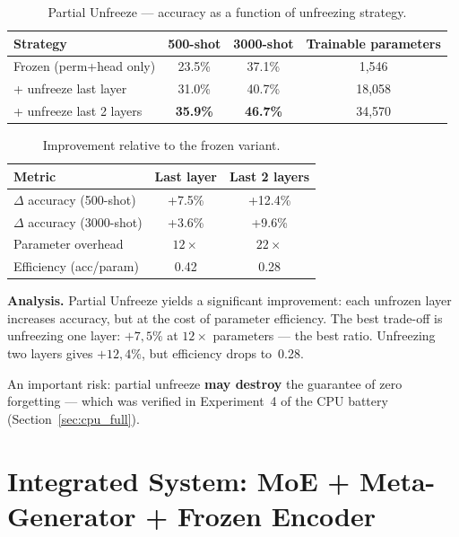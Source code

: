 \documentclass[11pt,a4paper]{report}
\begin{document}
\begin{table}[h!]
\centering
\caption{Partial Unfreeze --- accuracy as a function of unfreezing strategy.}
\begin{tabular}{l c c c}
\hline
\textbf{Strategy} & \textbf{500-shot} & \textbf{3000-shot} & \textbf{Trainable parameters} \\
\hline
Frozen (perm+head only) & 23.5\% & 37.1\% & 1,546 \\
+ unfreeze last layer & 31.0\% & 40.7\% & 18,058 \\
+ unfreeze last 2 layers & \textbf{35.9\%} & \textbf{46.7\%} & 34,570 \\
\hline
\end{tabular}
\label{tab:partial_unfreeze}
\end{table}

\begin{table}[h!]
\centering
\caption{Improvement relative to the frozen variant.}
\begin{tabular}{l c c}
\hline
\textbf{Metric} & \textbf{Last layer} & \textbf{Last 2 layers} \\
\hline
$\Delta$ accuracy (500-shot) & +7.5\% & +12.4\% \\
$\Delta$ accuracy (3000-shot) & +3.6\% & +9.6\% \\
Parameter overhead & $12\times$ & $22\times$ \\
Efficiency (acc/param) & 0.42 & 0.28 \\
\hline
\end{tabular}
\label{tab:partial_unfreeze_delta}
\end{table}

\textbf{Analysis.} Partial Unfreeze yields a significant improvement: each unfrozen layer increases
accuracy, but at the cost of parameter efficiency. The best trade-off is unfreezing
one layer: $+7{,}5\%$ at $12\times$ parameters --- the best ratio.
Unfreezing two layers gives $+12{,}4\%$, but efficiency drops to~0.28.

An important risk: partial unfreeze \textbf{may destroy} the guarantee of zero forgetting
--- which was verified in Experiment~4 of the CPU battery (Section~\ref{sec:cpu_full}).


\section{Integrated System: MoE + Meta-Generator + Frozen Encoder}
\end{document}
